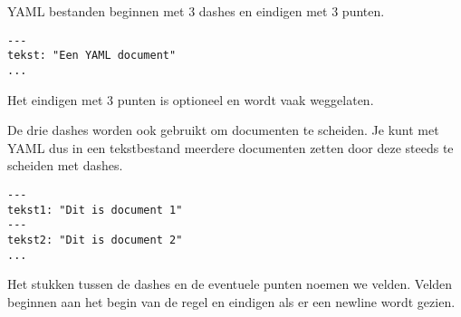 YAML bestanden beginnen met 3 dashes en eindigen met 3 punten.
\begin{verbatim}
---
tekst: "Een YAML document"
...
\end{verbatim}
Het eindigen met 3 punten is optioneel en wordt vaak weggelaten.

De drie dashes worden ook gebruikt om documenten te scheiden. Je kunt met YAML dus in een tekstbestand meerdere documenten zetten door deze steeds te scheiden met dashes.

\begin{verbatim}
---
tekst1: "Dit is document 1"
---
tekst2: "Dit is document 2"
...
\end{verbatim}

Het stukken tussen de dashes en de eventuele punten noemen we velden. Velden beginnen aan het begin van de regel en eindigen als er een newline wordt gezien.

